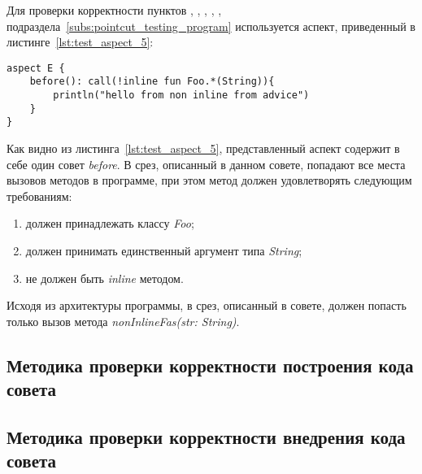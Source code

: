 Для проверки корректности пунктов \quotes{\ref{list:method_name_check}},
\quotes{\ref{list:class_name_check}},
\quotes{\ref{list:method_params_check}},
\quotes{\ref{list:method_modifiers_check}},
\quotes{\ref{list:method_inline_check}},
\quotes{\ref{list:logic_operations_check}} подраздела~\ref{subs:pointcut_testing_program} используется аспект, приведенный в листинге~\ref{lst:test_aspect_5}:
\begin{lstlisting}[style={java}, label={lst:test_aspect_5},
  caption={Пример тестового аспекта}]
aspect E {
    before(): call(!inline fun Foo.*(String)){
        println("hello from non inline from advice")
    }
}
\end{lstlisting}
Как видно из листинга~\ref{lst:test_aspect_5}, представленный аспект содержит в себе один совет \textit{before}.
В срез, описанный в данном совете, попадают все места вызовов методов в программе, при этом метод должен удовлетворять следующим требованиям:
\begin{enumerate}
	\item должен принадлежать классу \textit{Foo};
	\item должен принимать единственный аргумент типа \textit{String};
	\item не должен быть \textit{inline} методом.
\end{enumerate}

Исходя из архитектуры программы, в срез, описанный в совете, должен попасть только вызов метода \textit{nonInlineFas(str: String)}.
\subsection{Методика проверки корректности построения кода совета}
\label{sub:advice_building_methodology}
\subsection{Методика проверки корректности внедрения кода совета}
\label{sub:advice_weaving_methodology}

